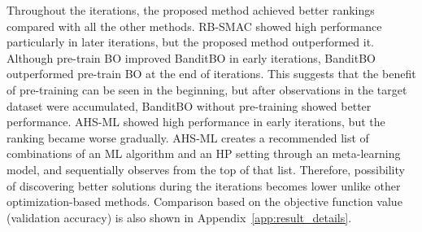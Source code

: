 Throughout the iterations, the proposed method achieved better rankings compared with all the other methods.
%
RB-SMAC showed high performance particularly in later iterations, but the proposed method outperformed it.
%
Although pre-train BO improved BanditBO in early iterations, BanditBO outperformed pre-train BO at the end of iterations.
%
This suggests that the benefit of pre-training can be seen in the beginning, but after observations in the target dataset were accumulated, BanditBO without pre-training showed better performance.  
%
AHS-ML showed high performance in early iterations, but the ranking became worse gradually. 
%
AHS-ML creates a recommended list of combinations of an ML algorithm and an HP setting through an meta-learning model, and sequentially observes from the top of that list.
%
Therefore, possibility of discovering better solutions during the iterations becomes lower unlike other optimization-based methods.
%
Comparison based on the objective function value (validation accuracy) is also shown in Appendix~\ref{app:result_details}. 



